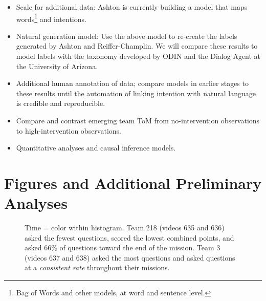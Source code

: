 \begin{itemize}
    \item Scale for additional data: Ashton is currently building a model that maps words\footnote{Bag of Words and other models, at word and sentence level.} and intentions.
    \item Natural generation model: Use the above model to re-create the labels
        generated by Ashton and Reiffer-Champlin. We will compare these results
        to model labels with the taxonomy developed by ODIN and the Dialog
        Agent at the University of Arizona.
    \item Additional human annotation of data; compare models in earlier stages to these results until the automation of linking intention with natural language is credible and reproducible.
    \item Compare and contrast emerging team ToM from no-intervention observations to high-intervention observations.
    \item Quantitative analyses and causal inference models.
\end{itemize}



\section{Figures and Additional Preliminary Analyses}

\begin{figure}[h!]
    \centering
    \caption{Time = color within histogram. Team 218 (videos 635 and 636) asked the
        fewest questions, scored the lowest combined points, and asked 66\%
        of questions toward the end of the mission. Team 3 (videos 637 and 638) asked
        the most questions and asked questions at a \emph{consistent rate} throughout their missions.}
    \end{figure}
    

